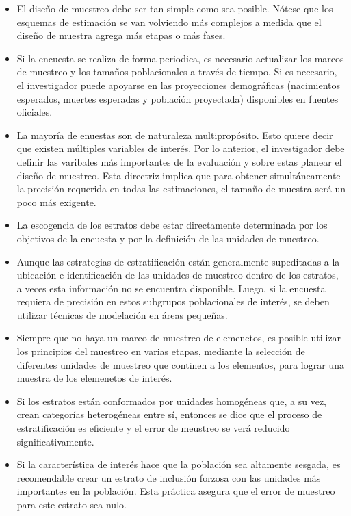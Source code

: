\documentclass[
  12pt,
  spanish,
]{book}
\begin{document}
\begin{itemize}
\item El diseño de muestreo debe ser tan simple como sea posible. Nótese que los esquemas de estimación se van volviendo más complejos a medida que el diseño de muestra agrega más etapas o más fases.
\item Si la encuesta se realiza de forma periodica, es necesario actualizar los marcos de muestreo y los tamaños poblacionales a través de tiempo. Si es necesario, el investigador puede apoyarse en las proyecciones demográficas (nacimientos esperados, muertes esperadas y población proyectada) disponibles en fuentes oficiales.
\item La mayoría de enuestas son de naturaleza multipropósito. Esto quiere decir que existen múltiples variables de interés. Por lo anterior, el investigador debe definir las varibales más importantes de la evaluación y sobre estas planear el diseño de muestreo. Esta directriz implica que para obtener simultáneamente la precisión requerida en todas las estimaciones, el tamaño de muestra será un poco más exigente. 
\item La escogencia de los estratos debe estar directamente determinada por los objetivos de la encuesta y por la definición de las unidades de muestreo.  
\item Aunque las estrategias de estratificación están generalmente supeditadas a la ubicación e identificación de las unidades de muestreo dentro de los estratos, a veces esta información no se encuentra disponible. Luego, si la encuesta requiera de precisión en estos subgrupos poblacionales de interés, se deben utilizar técnicas de modelación en áreas pequeñas. 
\item Siempre que no haya un marco de muestreo de elemenetos, es posible utilizar los principios del muestreo en varias etapas, mediante la selección de diferentes unidades de muestreo que continen a los elementos, para lograr una muestra de los elemenetos de interés.
\item Si los estratos están conformados por unidades homogéneas que, a su vez, crean categorías heterogéneas entre sí, entonces se dice que el proceso de estratificación es eficiente y el error de meustreo se verá reducido significativamente.
\item Si la característica de interés hace que la población sea altamente sesgada, es recomendable crear un estrato de inclusión forzosa con las unidades más importantes en la población. Esta práctica asegura que el error de muestreo para este estrato sea nulo. 

\end{itemize}
\end{document}
